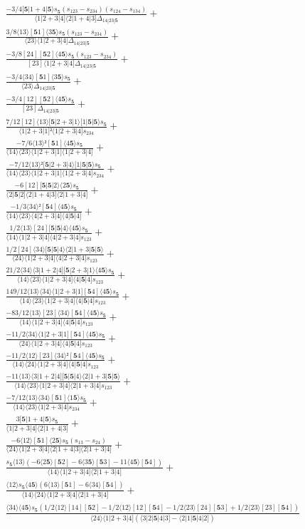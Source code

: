 \documentclass[varwidth, border=5pt]{standalone}
\begin{document}
\begin{my}
$\begin{gathered}
\scriptscriptstyle\frac{-3/4[𝟓|1+4|𝟓⟩s_{𝟓}(s_{123}-s_{234})(s_{124}-s_{134})}{⟨1|2+3|4]⟨2|1+4|3]Δ_{14|23|𝟓}} +\\
\scriptscriptstyle\frac{3/8⟨13⟩[𝟓1]⟨3𝟓⟩s_{𝟓}(s_{123}-s_{234})}{⟨23⟩⟨1|2+3|4]Δ_{14|23|𝟓}} +\\
\scriptscriptstyle\frac{-3/8[24][𝟓2]⟨4𝟓⟩s_{𝟓}(s_{123}-s_{234})}{[23]⟨1|2+3|4]Δ_{14|23|𝟓}} +\\
\scriptscriptstyle\frac{-3/4⟨34⟩[𝟓1]⟨3𝟓⟩s_{𝟓}}{⟨23⟩Δ_{14|23|𝟓}} +\\
\scriptscriptstyle\frac{-3/4[12][𝟓2]⟨4𝟓⟩s_{𝟓}}{[23]Δ_{14|23|𝟓}} +\\
\scriptscriptstyle\frac{7/12[12]⟨13⟩[𝟓|2+3|1⟩[1|𝟓|𝟓⟩s_{𝟓}}{⟨1|2+3|1]²⟨1|2+3|4]s_{234}} +\\
\scriptscriptstyle\frac{-7/6⟨13⟩²[𝟓1]⟨4𝟓⟩s_{𝟓}}{⟨14⟩⟨23⟩⟨1|2+3|1]⟨1|2+3|4]} +\\
\scriptscriptstyle\frac{-7/12⟨13⟩²[𝟓|2+3|4⟩[1|𝟓|𝟓⟩s_{𝟓}}{⟨14⟩⟨23⟩⟨1|2+3|1]⟨1|2+3|4]s_{234}} +\\
\scriptscriptstyle\frac{-6[12][𝟓|𝟓|2⟩⟨2𝟓⟩s_{𝟓}}{⟨2|𝟓|2]⟨2|1+4|3]⟨2|1+3|4]} +\\
\scriptscriptstyle\frac{-1/3⟨34⟩²[𝟓4]⟨4𝟓⟩s_{𝟓}}{⟨14⟩⟨23⟩⟨4|2+3|4]⟨4|𝟓|4]} +\\
\scriptscriptstyle\frac{1/2⟨13⟩[24][𝟓|𝟓|4⟩⟨4𝟓⟩s_{𝟓}}{⟨14⟩⟨1|2+3|4]⟨4|2+3|4]s_{123}} +\\
\scriptscriptstyle\frac{1/2[24]⟨34⟩[𝟓|𝟓|4⟩⟨2|1+3|𝟓|𝟓⟩}{⟨24⟩⟨1|2+3|4]⟨4|2+3|4]s_{123}} +\\
\scriptscriptstyle\frac{21/2⟨34⟩⟨3|1+2|4][𝟓|2+3|1⟩⟨4𝟓⟩s_{𝟓}}{⟨14⟩⟨23⟩⟨1|2+3|4]⟨4|𝟓|4]s_{123}} +\\
\scriptscriptstyle\frac{149/12⟨13⟩⟨34⟩⟨1|2+3|1][𝟓4]⟨4𝟓⟩s_{𝟓}}{⟨14⟩⟨23⟩⟨1|2+3|4]⟨4|𝟓|4]s_{123}} +\\
\scriptscriptstyle\frac{-83/12⟨13⟩[23]⟨34⟩[𝟓4]⟨4𝟓⟩s_{𝟓}}{⟨14⟩⟨1|2+3|4]⟨4|𝟓|4]s_{123}} +\\
\scriptscriptstyle\frac{-11/2⟨34⟩⟨1|2+3|1][𝟓4]⟨4𝟓⟩s_{𝟓}}{⟨24⟩⟨1|2+3|4]⟨4|𝟓|4]s_{123}} +\\
\scriptscriptstyle\frac{-11/2⟨12⟩[23]⟨34⟩²[𝟓4]⟨4𝟓⟩s_{𝟓}}{⟨14⟩⟨24⟩⟨1|2+3|4]⟨4|𝟓|4]s_{123}} +\\
\scriptscriptstyle\frac{-11⟨13⟩⟨3|1+2|4][𝟓|𝟓|4⟩⟨2|1+3|𝟓|𝟓⟩}{⟨14⟩⟨23⟩⟨1|2+3|4]⟨2|1+3|4]s_{123}} +\\
\scriptscriptstyle\frac{-7/12⟨13⟩⟨34⟩[𝟓1]⟨1𝟓⟩s_{𝟓}}{⟨14⟩⟨23⟩⟨1|2+3|4]s_{234}} +\\
\scriptscriptstyle\frac{3[𝟓|1+4|𝟓⟩s_{𝟓}}{⟨1|2+3|4]⟨2|1+4|3]} +\\
\scriptscriptstyle\frac{-6⟨12⟩[𝟓1]⟨2𝟓⟩s_{𝟓}(s_{13}-s_{24})}{⟨24⟩⟨1|2+3|4]⟨2|1+4|3]⟨2|1+3|4]} +\\
\scriptscriptstyle\frac{s_{𝟓}⟨13⟩(-6⟨2𝟓⟩[𝟓2]-6⟨3𝟓⟩[𝟓3]-11⟨4𝟓⟩[𝟓4])}{⟨14⟩⟨1|2+3|4]⟨2|1+3|4]} +\\
\scriptscriptstyle\frac{⟨12⟩s_{𝟓}⟨4𝟓⟩(6⟨13⟩[𝟓1]-6⟨34⟩[𝟓4])}{⟨14⟩⟨24⟩⟨1|2+3|4]⟨2|1+3|4]} +\\
\scriptscriptstyle\frac{⟨34⟩⟨4𝟓⟩s_{𝟓}(1/2⟨12⟩[14][𝟓2]-1/2⟨12⟩[12][𝟓4]-1/2⟨23⟩[24][𝟓3]+1/2⟨23⟩[23][𝟓4])}{⟨24⟩⟨1|2+3|4](⟨3|2|𝟓|4|3]-⟨2|1|𝟓|4|2])} \phantom{+}
\end{gathered}$
\end{my}
\end{document}
